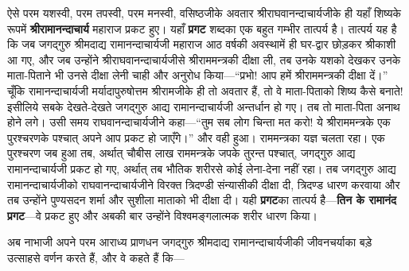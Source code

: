 \begin{sloppypar}\justifying{}
ऐसे परम यशस्वी, परम तपस्वी, परम मनस्वी, वसिष्ठजीके अवतार श्रीराघवानन्दाचार्यजीके ही यहाँ शिष्यके रूपमें \textbf{श्रीरामानन्दाचार्य} महाराज प्रकट हुए। यहाँ \textbf{प्रगट} शब्दका एक बहुत गम्भीर तात्पर्य है। तात्पर्य यह है कि जब जगद्गुरु श्रीमदाद्य रामानन्दाचार्यजी महाराज आठ वर्षकी अवस्थामें ही घर-द्वार छोड़कर श्रीकाशी आ गए, और जब उन्होंने श्रीराघवानन्दाचार्यजीसे श्रीराममन्त्रकी दीक्षा ली, तब उनके यशको देखकर उनके माता-पिताने भी उनसे दीक्षा लेनी चाही और अनुरोध किया—“प्रभो! आप हमें श्रीराममन्त्रकी दीक्षा दें।” चूँकि रामानन्दाचार्यजी मर्यादापुरुषोत्तम श्रीरामजीके ही तो अवतार हैं, तो वे माता-पिताको शिष्य कैसे बनाते! इसीलिये सबके देखते-देखते जगद्गुरु आद्य रामानन्दाचार्यजी अन्तर्धान हो गए। तब तो माता-पिता अनाथ होने लगे। उसी समय राघवानन्दाचार्यजीने कहा—“तुम सब लोग चिन्ता मत करो! ये श्रीराममन्त्रके एक पुरश्चरणके पश्चात् अपने आप प्रकट हो जाएँगे।” और वही हुआ। राममन्त्रका यज्ञ चलता रहा। एक पुरश्चरण जब हुआ तब, अर्थात् चौबीस लाख राममन्त्रके जपके तुरन्त पश्चात्, जगद्गुरु आद्य रामानन्दाचार्यजी प्रकट हो गए, अर्थात् तब भौतिक शरीरसे कोई लेना-देना नहीं रहा। तब जगद्गुरु आद्य रामानन्दाचार्यजीको राघवानन्दाचार्यजीने विरक्त त्रिदण्डी संन्यासीकी दीक्षा दी, त्रिदण्ड धारण करवाया और तब उन्होंने पुण्यसदन शर्मा और सुशीला माताको भी दीक्षा दी। यही \textbf{प्रगट}का तात्पर्य है—\textbf{तिन के रामानंद प्रगट}—वे प्रकट हुए और अबकी बार उन्होंने विश्वमङ्गलात्मक शरीर धारण किया।
\end{sloppypar}
\begin{sloppypar}\justifying{}
अब नाभाजी अपने परम आराध्य प्राणधन जगद्गुरु श्रीमदाद्य रामानन्दाचार्यजीकी जीवनचर्याका बड़े उत्साहसे वर्णन करते हैं, और वे कहते हैं कि—
\end{sloppypar}


